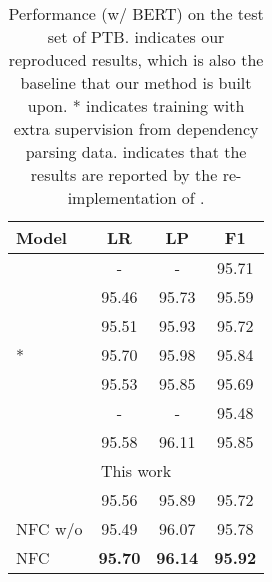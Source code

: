 \documentclass[11pt]{article}
\begin{document}
\begin{table}[!t]
\centering
    \begin{adjustbox}{max width=1.0\columnwidth}
    \begin{tabular}{lccc}
\hline
        {\bf Model} & {\bf LR} & {\bf LP} & {\bf F1} \\
        \hline
        \citet{liu-zhang-2017-order}  & - & - & 95.71 \\
        \citet{san-constituency} & 95.46 & 95.73 & 95.59 \\
        \citet{head-driven} & 95.51 & 95.93 & 95.72 \\
        \citet{head-driven} * & 95.70 & 95.98 & 95.84 \\
        \citet{constituency-crf} & 95.53 & 95.85 & 95.69 \\
        \citet{constituency-point} & - & - & 95.48 \\
\citet{span-attention} & 95.58 & 96.11 & 95.85 \\
        \hline
        \multicolumn{4}{c}{This work} \\
        \hline
        \citet{san-constituency}  & 95.56 & 95.89 & 95.72 \\
NFC w/o  & 95.49 & 96.07 & 95.78 \\
NFC & {\bf 95.70} & {\bf 96.14} & {\bf 95.92} \\
        \hline
    \end{tabular}
    \end{adjustbox}
    \caption{Performance (w/ BERT) on the test set of PTB.  indicates our reproduced results, which is also the baseline that our method is built upon. * indicates training with extra supervision from dependency parsing data.  indicates that the results are reported by the re-implementation of \citet{cross-domain-parser}. }
    \label{tab:ptb}
\end{table}
\end{document}
